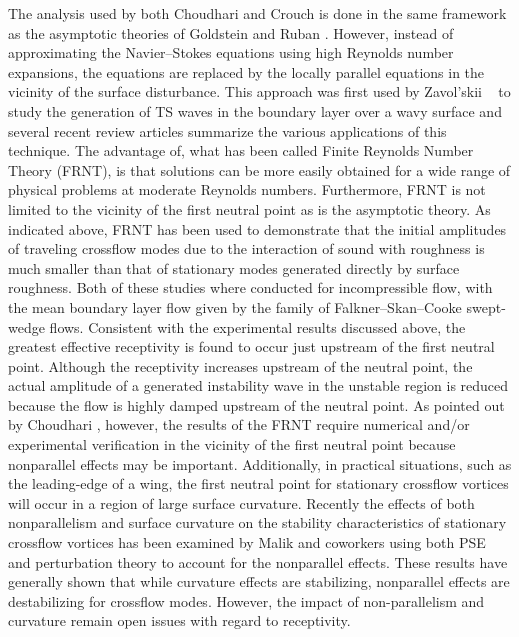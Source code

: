The analysis used by both Choudhari \cite{Choudhari:94} and Crouch
\cite{Crouch:93} is done in the same framework as the asymptotic theories of
Goldstein \cite{Goldstein:85} and Ruban \cite{Ruban:84}.  However, instead of
approximating the Navier--Stokes equations using high Reynolds number
expansions, the equations are replaced by the locally parallel equations in
the vicinity of the surface disturbance.  This approach was first used by
Zavol'skii \etal\ \cite{ZaReRy:83} to study the generation of TS waves in the
boundary layer over a wavy surface and several recent review articles
\cite{ChSt:94,Crouch:94} summarize the various applications of this technique.
The advantage of, what has been called Finite Reynolds Number Theory (FRNT),
is that solutions can be more easily obtained for a wide range of physical
problems at moderate Reynolds numbers.  Furthermore, FRNT is not limited to
the vicinity of the first neutral point as is the asymptotic theory.  As
indicated above, FRNT has been used to demonstrate that the initial amplitudes
of traveling crossflow modes due to the interaction of sound with roughness is
much smaller than that of stationary modes generated directly by surface
roughness.  Both of these studies where conducted for incompressible flow,
with the mean boundary layer flow given by the family of Falkner--Skan--Cooke
\cite{Cooke:50} swept-wedge flows.  Consistent with the experimental results
discussed above, the greatest effective receptivity is found to occur just
upstream of the first neutral point.  Although the receptivity increases
upstream of the neutral point, the actual amplitude of a generated instability
wave in the unstable region is reduced because the flow is highly damped
upstream of the neutral point.  As pointed out by Choudhari
\cite{Choudhari:94}, however, the results of the FRNT require numerical and/or
experimental verification in the vicinity of the first neutral point because
nonparallel effects may be important.  Additionally, in practical situations,
such as the leading-edge of a wing, the first neutral point for stationary
crossflow vortices will occur in a region of large surface curvature.
Recently the effects of both nonparallelism and surface curvature on the
stability characteristics of stationary crossflow vortices has been examined
by Malik and coworkers \cite{MaMa:94,MaBa:93,MaLi:93} using both PSE and
perturbation theory to account for the nonparallel effects.  These results
have generally shown that while curvature effects are stabilizing, nonparallel
effects are destabilizing for crossflow modes.  However, the impact of
non-parallelism and curvature remain open issues with regard to receptivity.

